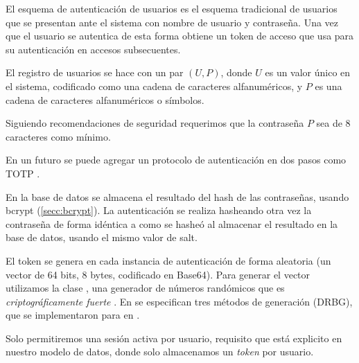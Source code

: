 El esquema de autenticación de usuarios es el esquema tradicional de usuarios
que se presentan ante el sistema con nombre de usuario y contraseña.
Una vez que el usuario se autentica de esta forma obtiene un token de acceso
que usa para su autenticación en accesos subsecuentes.\label{secc:autenticacion}

El registro de usuarios se hace con un par \((U, P)\), donde
\(U\) es un valor único en el sistema, codificado como una cadena de caracteres
alfanuméricos, y \(P\) es una cadena de caracteres alfanuméricos o símbolos.

Siguiendo recomendaciones de seguridad \autocite[13]{nist800-63b} requerimos
que la contraseña \(P\) sea de 8 caracteres como mínimo.

En un futuro se puede agregar un protocolo de autenticación en dos pasos como 
TOTP \autocite{rfc6238}.

En la base de datos se almacena el resultado del hash de las contraseñas, usando
bcrypt (\autoref{secc:bcrypt}).
La autenticación se realiza hasheando otra vez la contraseña de forma idéntica
a como se hasheó al almacenar el resultado en la base de datos, usando el mismo
valor de salt. 

El token se genera en cada instancia de autenticación de forma aleatoria (un
vector de 64 bits, 8 bytes, codificado en Base64)\label{secc:token}.
Para generar el vector utilizamos la clase , una generador
de números randómicos que es \emph{criptográficamente fuerte}
\autocite{SecureRandom}.  En \autocite{nist800-90a} se especifican tres métodos
de generación (DRBG), que se implementaron para  en
\autocite{jep273}.

Solo permitiremos una sesión activa por usuario, requisito que está explicito
en nuestro modelo de datos, donde solo almacenamos un \emph{token} por usuario.

